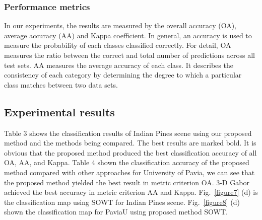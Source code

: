 \documentclass{ws-ijwmip}
\begin{document}
\subsubsection{Performance metrics }

In our experiments, the results are measured by the overall accuracy (OA), average accuracy (AA) and Kappa coefficient. In general, an accuracy is used to measure the probability of each classes classified correctly. For detail, OA measures the ratio between the correct and total number of predictions across all test sets. AA measures the average accuracy of each class. It describes the consistency of each category by determining the degree to which a particular class matches between two data sets.


\subsection{Experimental results}
Table 3 shows the classification results of Indian Pines scene using our proposed method and the methods being compared. The best results are marked bold. It is obvious that the proposed method produced the best classification accuracy of all OA, AA, and Kappa. Table 4 shown the classification accuracy of the proposed method compared with other approaches for University of Pavia, we can see that the proposed method yielded the best result in metric criterion OA. 3-D Gabor achieved the best accuracy in metric criterion AA and Kappa. Fig.~\ref{figure7} (d) is the classification map using SOWT for Indian Pines scene.  Fig.~\ref{figure8} (d) shown the classification map for PaviaU using proposed method SOWT.
\end{document}
